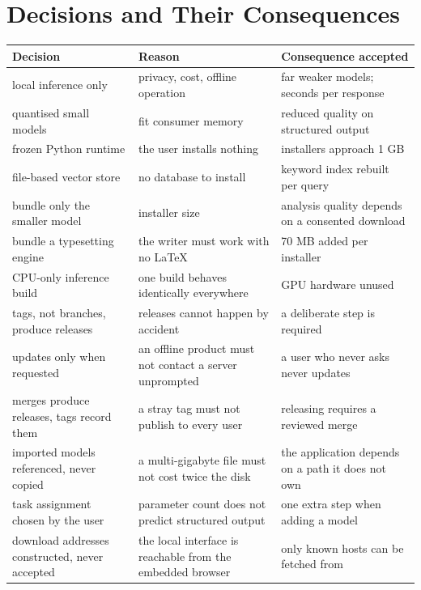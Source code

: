 \documentclass[11pt,a4paper]{article}
\begin{document}
\section{Decisions and Their Consequences}

\begin{center}
\small
\begin{tabularx}{\linewidth}{@{}XXX@{}}
\toprule
\textbf{Decision} & \textbf{Reason} & \textbf{Consequence accepted} \\
\midrule
local inference only & privacy, cost, offline operation & far weaker models; seconds per response \\
quantised small models & fit consumer memory & reduced quality on structured output \\
frozen Python runtime & the user installs nothing & installers approach 1 GB \\
file-based vector store & no database to install & keyword index rebuilt per query \\
bundle only the smaller model & installer size & analysis quality depends on a consented download \\
bundle a typesetting engine & the writer must work with no LaTeX & 70 MB added per installer \\
CPU-only inference build & one build behaves identically everywhere & GPU hardware unused \\
tags, not branches, produce releases & releases cannot happen by accident & a deliberate step is required \\
updates only when requested & an offline product must not contact a server unprompted & a user who never asks never updates \\
merges produce releases, tags record them & a stray tag must not publish to every user & releasing requires a reviewed merge \\
imported models referenced, never copied & a multi-gigabyte file must not cost twice the disk & the application depends on a path it does not own \\
task assignment chosen by the user & parameter count does not predict structured output & one extra step when adding a model \\
download addresses constructed, never accepted & the local interface is reachable from the embedded browser & only known hosts can be fetched from \\
\bottomrule
\end{tabularx}
\end{center}
\end{document}
